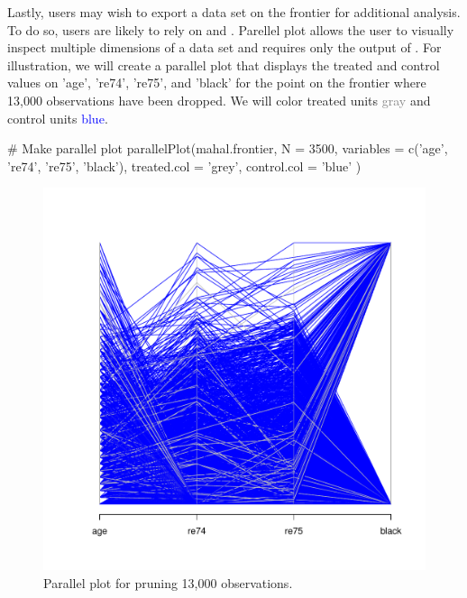 \documentclass[nojss]{jss}
\begin{document}
Lastly, users may wish to export a data set on the frontier for
additional analysis. To do so, users are likely to rely on
 and . Parellel plot
allows the user to visually inspect multiple dimensions of a data set
and requires only the output of . For
illustration, we will create a parallel plot that displays 
the treated and control values on 'age', 're74', 're75', and
'black' for the point on the frontier where 13,000 observations
have been dropped. We will color treated units \textcolor{gray}{gray}
and control units \textcolor{blue}{blue}.

\begin{minipage}{0.45\textwidth}
\begin{CodeChunk}
\begin{CodeInput}
# Make parallel plot
parallelPlot(mahal.frontier,
             N = 3500,
             variables = c('age',
             're74',
             're75',
             'black'),
             treated.col = 'grey',
             control.col = 'blue'
             )
\end{CodeInput}
\end{CodeChunk}
\end{minipage}
\begin{minipage}{0.5\textwidth}
\begin{figure}[H]
\includegraphics{mahal_parplot.pdf}
\caption{\label{fig:mahal_parplot} Parallel plot for pruning 13,000 observations.}
\end{figure}
\end{minipage} \hfill
\newline
\newline
\end{document}

